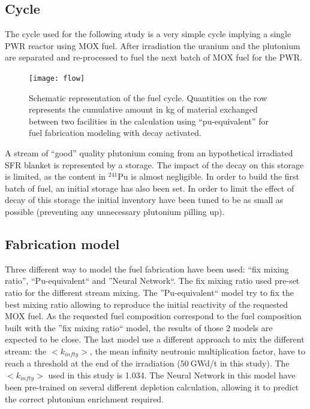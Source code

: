 \documentclass{anstrans}
\begin{document}
\subsection{Cycle}
The cycle used for the following study is a very simple cycle implying a single
PWR reactor using MOX fuel. After irradiation the uranium and the plutonium are
separated and re-processed to fuel the next batch of MOX fuel for the PWR.

\begin{figure}[ht] %
  \centering
  \texttt{[image: flow]}
  \caption{Schematic representation of the fuel cycle. Quantities on the row
  represents the cumulative amount in kg of material exchanged between two
facilities in the calculation using ``pu-equivalent'' for fuel fabrication
modeling with decay activated.}
  \label{fig:flow}
\end{figure}

A stream of ``good'' quality plutonium coming from an hypothetical irradiated
SFR blanket is represented by a storage. The impact of the decay on this storage
is limited, as the content in $^{241}$Pu is almost negligible.  In order to
build the first batch of fuel, an initial storage has also been set.  In order
to limit the effect of decay of this storage the initial inventory have been
tuned to be as small as possible (preventing any unnecessary plutonium pilling
up).

\subsection{Fabrication model}
Three different way to model the fuel fabrication have been used: ``fix mixing
ratio'', ``Pu-equivalent`` and ''Neural Network``.
The fix mixing ratio used pre-set ratio for the different stream mixing. The
''Pu-equivalent`` model try to fix the best mixing ratio allowing to reproduce
the initial reactivity of the requested MOX fuel. As the requested fuel
composition correspond to the fuel composition built with the ''fix mixing
ratio`` model, the results of those 2 models are expected to be close.
The last model use a different approach to mix the different stream: the
$<k_{infty}>$, the mean infinity neutronic multiplication factor, have to reach
a threshold at the end of the irradiation ($50~$GWd/t in this study). The
$<k_{infty}>$ used in this study is 1.034. The Neural Network in this
model have been pre-trained on several different depletion calculation,
allowing it to predict the correct plutonium enrichment required.
\end{document}
